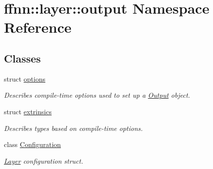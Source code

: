 \hypertarget{namespaceffnn_1_1layer_1_1output}{\section{ffnn\-:\-:layer\-:\-:output Namespace Reference}
\label{namespaceffnn_1_1layer_1_1output}
}
\subsection*{Classes}
\begin{DoxyCompactItemize}
\item 
struct \hyperlink{structffnn_1_1layer_1_1output_1_1options}{options}
\begin{DoxyCompactList}\small\item\em Describes compile-\/time options used to set up a \hyperlink{classffnn_1_1layer_1_1_output}{Output} object. \end{DoxyCompactList}\item 
struct \hyperlink{structffnn_1_1layer_1_1output_1_1extrinsics}{extrinsics}
\begin{DoxyCompactList}\small\item\em Describes types based on compile-\/time options. \end{DoxyCompactList}\item 
class \hyperlink{classffnn_1_1layer_1_1output_1_1_configuration}{Configuration}
\begin{DoxyCompactList}\small\item\em \hyperlink{classffnn_1_1layer_1_1_layer}{Layer} configuration struct. \end{DoxyCompactList}\end{DoxyCompactItemize}
